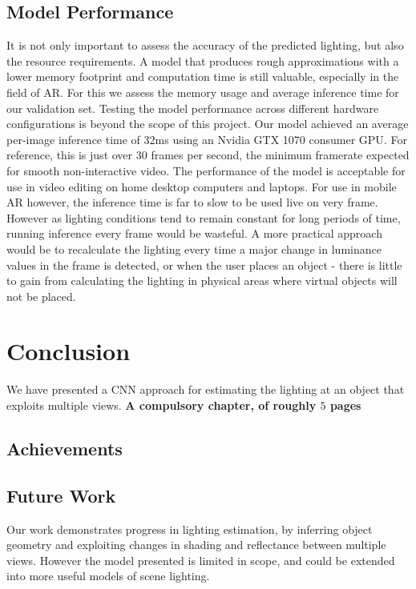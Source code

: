 \documentclass[ %
                    author={Gavin Parker},
                supervisor={Dr. Neill Campbell},
                    degree={MEng},
                     title={Deep Siamese Networks for Illumination Estimation from Stereo Images},
                  subtitle={},
                      type={research},
                      year={2018} ]{dissertation}
\begin{document}
\section{Model Performance}
It is not only important to assess the accuracy of the predicted lighting, but also the resource requirements. A model that produces rough approximations with a lower memory footprint and computation time is still valuable, especially in the field of AR. For this we assess the memory usage and average inference time for our validation set. Testing the model performance across different hardware configurations is beyond the scope of this project. Our model achieved an average per-image inference time of 32ms using an Nvidia GTX 1070 consumer GPU. For reference, this is just over 30 frames per second, the minimum framerate expected for smooth non-interactive video. The performance of the model is acceptable for use in video editing on home desktop computers and laptops. For use in mobile AR however, the inference time is far to slow to be used live on very frame. However as lighting conditions tend to remain constant for long periods of time, running inference every frame would be wasteful. A more practical approach would be to recalculate the lighting every time a major change in luminance values in the frame is detected, or when the user places an object - there is little to gain from calculating the lighting in physical areas where virtual objects will not be placed.
\chapter{Conclusion}
\label{chap:conclusion}
We have presented a CNN approach for estimating the lighting at an object that exploits multiple views.
{\bf A compulsory chapter,     of roughly $5$ pages} 
\vspace{1cm} 

\noindent
\section{Achievements}
\section{Future Work}
Our work demonstrates progress in lighting estimation, by inferring object geometry and exploiting changes in shading and reflectance between multiple views. However the model presented is limited in scope, and could be extended into more useful models of scene lighting.
\end{document}
